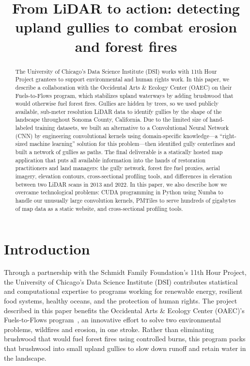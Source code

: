 \title{From LiDAR to action: detecting upland gullies to combat erosion and forest fires}

\begin{abstract}

The University of Chicago's Data Science Institute (DSI) works with 11th Hour Project grantees to support environmental and human rights work. In this paper, we describe a collaboration with the Occidental Arts \& Ecology Center (OAEC) on their Fuels-to-Flows program, which stabilizes upland waterways by adding brushwood that would otherwise fuel forest fires. Gullies are hidden by trees, so we used publicly available, sub-meter resolution LiDAR data to identify gullies by the shape of the landscape throughout Sonoma County, California. Due to the limited size of hand-labeled training datasets, we built an alternative to a Convolutional Neural Network (CNN) by engineering convolutional kernels using domain-specific knowledge---a ``right-sized machine learning'' solution for this problem---then identified gully centerlines and built a network of gullies as paths. The final deliverable is a statically hosted map application that puts all available information into the hands of restoration practitioners and land managers: the gully network, forest fire fuel proxies, aerial imagery, elevation contours, cross-sectional profiling tools, and differences in elevation between two LiDAR scans in 2013 and 2022. In this paper, we also describe how we overcame technological problems: CUDA programming in Python using Numba to handle our unusually large convolution kernels, PMTiles to serve hundreds of gigabytes of map data as a static website, and cross-sectional profiling tools.

\end{abstract}

\section{Introduction}

Through a partnership with the Schmidt Family Foundation's 11th Hour Project, the University of Chicago's Data Science Institute (DSI) contributes statistical and computational expertise to programs working for renewable energy, resilient food systems, healthy oceans, and the protection of human rights. The project described in this paper benefits the Occidental Arts \& Ecology Center (OAEC)'s Fuels-to-Flows program~\citep{Dolman2025FuelsToFlows,OAECGullyStuffing}, an innovative effort to solve two environmental problems, wildfires and erosion, in one stroke. Rather than eliminating brushwood that would fuel forest fires using controlled burns, this program packs that brushwood into small upland gullies to slow down runoff and retain water in the landscape.

